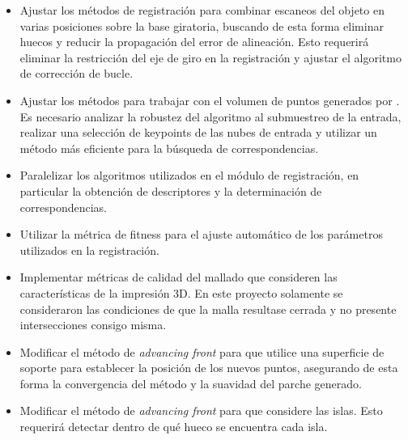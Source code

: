 \begin{itemize}
	\item Ajustar los métodos de registración para combinar escaneos del objeto
		en varias posiciones sobre la base giratoria,
		buscando de esta forma eliminar huecos y reducir la propagación del error de alineación.
		Esto requerirá eliminar la restricción del eje de giro en la registración
		y ajustar el algoritmo de corrección de bucle.
	\item Ajustar los métodos para trabajar con el volumen de puntos generados
		por \cite{Pancho}.
		Es necesario analizar la robustez del algoritmo al submuestreo de la entrada,
		realizar una selección de keypoints de las nubes de entrada
		y utilizar un método más eficiente para la búsqueda de correspondencias.
	\item Paralelizar los algoritmos utilizados en el módulo de registración,
		en particular la obtención de descriptores y la determinación de correspondencias.
	\item Utilizar la métrica de fitness para el ajuste automático de los parámetros utilizados en la registración.
	\item Implementar métricas de calidad del mallado que consideren las
		características de la impresión 3D.
		En este proyecto solamente se consideraron las condiciones de que la malla
		resultase cerrada y no presente intersecciones consigo misma.
	\item Modificar el método de \emph{advancing front} para que utilice una
		superficie de soporte para establecer la posición de los nuevos puntos,
		asegurando de esta forma la convergencia del método y la suavidad del
		parche generado.
	\item Modificar el método de \emph{advancing front} para que considere las islas.
		Esto requerirá detectar dentro de qué hueco se encuentra cada isla.
\end{itemize}
